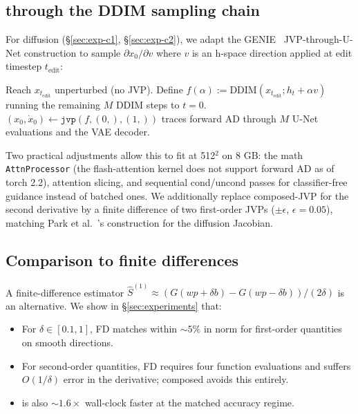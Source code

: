 \subsection{\jvp through the DDIM sampling chain}
For diffusion (\S\ref{sec:exp-c1}, \S\ref{sec:exp-c2}), we adapt the
GENIE~\cite{Dockhorn2022GENIE} JVP-through-U-Net construction to
sample $\partial x_0 / \partial v$ where $v$ is an h-space direction
applied at edit timestep $t_{\text{edit}}$:
\begin{algorithmic}
\STATE Reach $x_{t_{\text{edit}}}$ unperturbed (no JVP).
\STATE Define $f(\alpha) := \text{DDIM}(x_{t_{\text{edit}}}; h_t + \alpha v)$
       running the remaining $M$ DDIM steps to $t=0$.
\STATE $(x_0, \dot x_0) \leftarrow \texttt{jvp}(f, (0,), (1,))$
       traces forward AD through $M$ U-Net evaluations and the VAE
       decoder.
\end{algorithmic}
Two practical adjustments allow this to fit at 512$^2$ on 8 GB:
the math \texttt{AttnProcessor} (the flash-attention kernel does not
support forward AD as of torch 2.2), attention slicing, and
sequential cond/uncond passes for classifier-free guidance instead
of batched ones. We additionally replace composed-JVP for the
second derivative by a finite difference of two first-order JVPs
($\pm\epsilon$, $\epsilon = 0.05$), matching Park et
al.~\cite{Park2023Riemannian}'s construction for the diffusion
Jacobian.

\subsection{Comparison to finite differences}
A finite-difference estimator
$\hat S^{(1)} \approx (G(wp + \delta b) - G(wp - \delta b))/(2\delta)$
is an alternative. We show in \S\ref{sec:experiments} that:
\begin{itemize}
\item For $\delta \in [0.1, 1]$, FD matches \jvp within $\sim 5\%$ in
      norm for first-order quantities on smooth directions.
\item For second-order quantities, FD requires four function
      evaluations and suffers $O(1/\delta)$ error in the derivative;
      composed \jvp avoids this entirely.
\item \jvp is also $\sim 1.6\times$ wall-clock faster at the matched
      accuracy regime.
\end{itemize}
